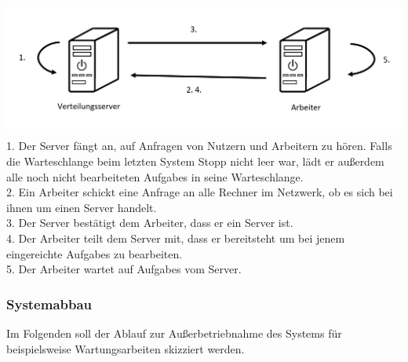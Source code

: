\documentclass[a4paper,12pt]{article}
\begin{document}
\includegraphics[width=\linewidth]{Systemmodelle/Models/Init.PNG}
\\
1. Der \gls{Server} fängt an, auf Anfragen von Nutzern und Arbeitern zu hören. Falls die \gls{Warteschlange} beim letzten System Stopp nicht leer war, lädt er außerdem alle noch nicht bearbeiteten \glspl{Aufgabe} in seine \gls{Warteschlange}.\\
2. Ein \gls{Arbeiter} schickt eine Anfrage an alle Rechner im Netzwerk, ob es sich bei ihnen um einen \gls{Server} handelt. \\
3. Der \gls{Server} bestätigt dem \gls{Arbeiter}, dass er ein \gls{Server} ist.\\
4. Der \gls{Arbeiter} teilt dem \gls{Server} mit, dass er bereitsteht um bei jenem eingereichte \glspl{Aufgabe} zu bearbeiten.\\
5. Der \gls{Arbeiter} wartet auf \glspl{Aufgabe} vom \gls{Server}.

\subsubsection{Systemabbau}
Im Folgenden soll der Ablauf zur Außerbetriebnahme des Systems für beispielsweise Wartungsarbeiten skizziert werden.\\
\end{document}
